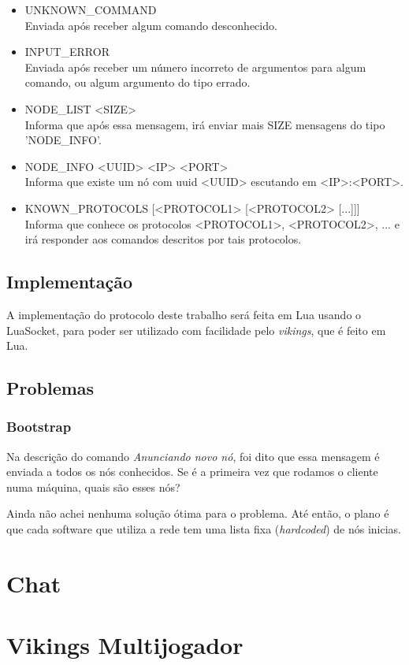       \begin{itemize}
        \item UNKNOWN\_COMMAND \\
          Enviada após receber algum comando desconhecido.
          
        \item INPUT\_ERROR \\
          Enviada após receber um número incorreto de argumentos para algum comando, ou algum
          argumento do tipo errado.
      
        \item NODE\_LIST <SIZE> \\
          Informa que após essa mensagem, irá enviar mais SIZE mensagens do tipo 'NODE\_INFO'.
          
        \item NODE\_INFO <UUID> <IP> <PORT> \\
          Informa que existe um nó com uuid <UUID> escutando em <IP>:<PORT>.
          
        \item KNOWN\_PROTOCOLS [<PROTOCOL1> [<PROTOCOL2> [...]]] \\
          Informa que conhece os protocolos <PROTOCOL1>, <PROTOCOL2>, ... e irá responder aos
          comandos descritos por tais protocolos.
      
      \end{itemize}
      
  \subsection{Implementação}
    A implementação do protocolo deste trabalho será feita em Lua usando o LuaSocket, %
    para poder ser utilizado com facilidade pelo \textit{vikings}, que é feito em Lua.
  
  \subsection{Problemas}
    \subsubsection{Bootstrap}
      Na descrição do comando \textit{Anunciando novo nó}, foi dito que essa mensagem é enviada a
      todos os nós conhecidos. Se é a primeira vez que rodamos o cliente numa máquina, quais são
      esses nós?
      
      Ainda não achei nenhuma solução ótima para o problema. Até então, o plano é que cada software
      que utiliza a rede tem uma lista fixa (\textit{hardcoded}) de nós inicias.
\section{Chat}
\label{sec:resultados:chat}

\section{Vikings Multijogador}
\label{sec:resultados:vikings}
